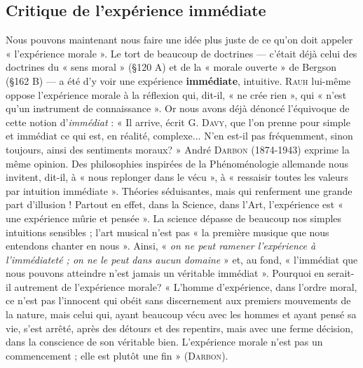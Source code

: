 \subsection{Critique de l'expérience immédiate}%
Nous pouvons
maintenant nous faire une idée plus juste de ce qu’on doit appeler
« l’expérience morale ». Le tort de beaucoup de doctrines — c'était
déjà celui des doctrines du « sens moral » (\S 120 A) et de la « morale
ouverte » de Bergson (\S 162 B) — a été d’y voir une expérience {\bf immédiate},
intuitive. \textsc{Rauh} lui-même oppose l'expérience morale à la
réflexion qui, dit-il, « ne crée rien », qui « n’est qu’un instrument
de connaissance ». Or nous avons déjà dénoncé l’équivoque de
cette notion d’{\it immédiat} : « Il arrive, écrit G. \textsc{Davy}, que l’on prenne
pour simple et immédiat ce qui est, en réalité, complexe... N'en
est-il pas fréquemment, sinon toujours, ainsi des sentiments
moraux? » André \textsc{Darbon} (1874-1943) exprime la même opinion.
Des philosophies inspirées de la Phénoménologie allemande nous
invitent, dit-il, à « nous replonger dans le vécu », à « ressaisir toutes
les valeurs par intuition immédiate ». Théories séduisantes, mais qui
renferment une grande part d’illusion ! Partout en effet, dans la
Science, dans l’Art, l'expérience est « une expérience mûrie et pensée ».
La science dépasse de beaucoup nos simples intuitions sensibles ; l’art
musical n’est pas « la première musique que nous entendons chanter
en nous ». Ainsi, « {\it on ne peut ramener l'expérience à l’immédiateté ; on ne
le peut dans aucun domaine} » et, au fond, « l’immédiat que nous pouvons
atteindre n’est jamais un véritable immédiat ». Pourquoi en
serait-il autrement de l’expérience morale? « L'homme d’expérience,
dans l’ordre moral, ce n’est pas l’innocent qui obéit sans discernement
aux premiers mouvements de la nature, mais celui qui, ayant beaucoup
vécu avec les hommes et ayant pensé sa vie, s’est arrêté, après des
détours et des repentirs, mais avec une ferme décision, dans la conscience
de son véritable bien. L'expérience morale n’est pas un commencement ;
elle est plutôt une fin » (\textsc{Darbon}).

